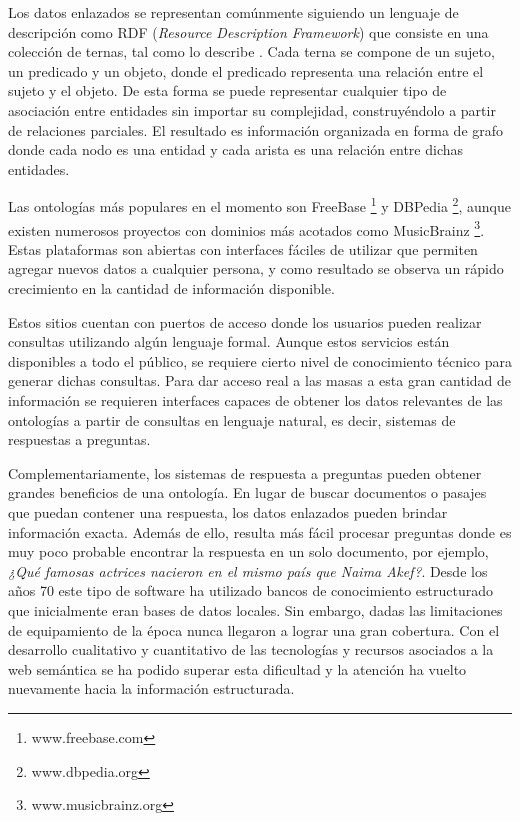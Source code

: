 Los datos enlazados se representan comúnmente siguiendo un lenguaje de descripción como RDF (\textit{Resource Description Framework}) que consiste en una colección de ternas, tal como lo describe \citet{brickleyRDF}. Cada terna se compone de un sujeto, un predicado y un objeto, donde el predicado representa una relación entre el sujeto y el objeto. De esta forma se puede representar cualquier tipo de asociación entre entidades sin importar su complejidad, construyéndolo a partir de relaciones parciales. El resultado es información organizada en forma de grafo donde cada nodo es una entidad y cada arista es una relación entre dichas entidades.

Las ontologías más populares en el momento son FreeBase \footnote{www.freebase.com} y DBPedia \footnote{www.dbpedia.org}, aunque existen numerosos proyectos con dominios más acotados como MusicBrainz \footnote{www.musicbrainz.org}. Estas plataformas son abiertas con interfaces fáciles de utilizar que permiten agregar nuevos datos a cualquier persona, y como resultado se observa un rápido crecimiento en la cantidad de información disponible.

Estos sitios cuentan con puertos de acceso donde los usuarios pueden realizar consultas utilizando algún lenguaje formal. Aunque estos servicios están disponibles a todo el público, se requiere cierto nivel de conocimiento técnico para generar dichas consultas. Para dar acceso real a las masas a esta gran cantidad de información se requieren interfaces capaces de obtener los datos relevantes de las ontologías a partir de consultas en lenguaje natural, es decir, sistemas de respuestas a preguntas.

Complementariamente, los sistemas de respuesta a preguntas pueden obtener grandes beneficios de una ontología. En lugar de buscar documentos o pasajes que puedan contener una respuesta, los datos enlazados pueden brindar información exacta. Además de ello, resulta más fácil procesar preguntas donde es muy poco probable encontrar la respuesta en un solo documento, por ejemplo, \textit{¿Qué famosas actrices nacieron en el mismo país que Naima Akef?}. Desde los años 70 este tipo de software ha utilizado bancos de conocimiento estructurado que inicialmente eran bases de datos locales. Sin embargo, dadas las limitaciones de equipamiento de la época nunca llegaron a lograr una gran cobertura. Con el desarrollo cualitativo y cuantitativo de las tecnologías y recursos asociados a la web semántica se ha podido superar esta dificultad y la atención ha vuelto nuevamente hacia la información estructurada.

